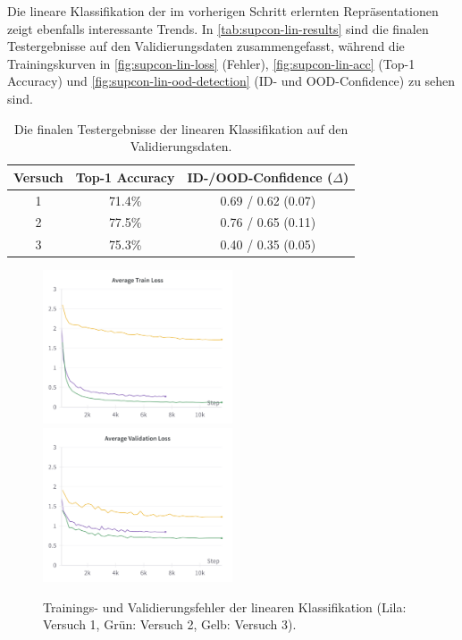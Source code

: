 Die lineare Klassifikation der im vorherigen Schritt erlernten Repräsentationen zeigt ebenfalls interessante Trends. In \autoref{tab:supcon-lin-results} sind die finalen Testergebnisse auf den Validierungsdaten zusammengefasst, während die Trainingskurven in \autoref{fig:supcon-lin-loss} (Fehler), \autoref{fig:supcon-lin-acc} (Top-1 Accuracy) und \autoref{fig:supcon-lin-ood-detection} (ID- und OOD-Confidence) zu sehen sind.

\begin{table}[h]
	\caption{Die finalen Testergebnisse der linearen Klassifikation auf den Validierungsdaten.}
	\begin{tabular}{|c|c|c|}
		\hline
		\textbf{Versuch} & \textbf{Top-1 Accuracy} & \textbf{ID-/OOD-Confidence ($\Delta$)} \\
		\hline
		1 & 71.4\% & 0.69 / 0.62 (0.07) \\
		2 & 77.5\% & 0.76 / 0.65 (0.11) \\
		3 & 75.3\% & 0.40 / 0.35 (0.05) \\
		\hline
	\end{tabular}
	\label{tab:supcon-lin-results}
\end{table}

\newpage

\begin{figure}[h]
	\centering
	\includegraphics[width=0.5\textwidth]{figure_results_supcon-lin_avg-train-loss.png}%
	\includegraphics[width=0.5\textwidth]{figure_results_supcon-lin_avg-val-loss.png}
	\caption[Trainings- und Validierungsfehler der linearen Klassifikation.]{Trainings- und Validierungsfehler der linearen Klassifikation (\textcolor{exp1}{Lila}: Versuch 1, \textcolor{exp2}{Grün}: Versuch 2, \textcolor{exp3}{Gelb}: Versuch 3).}
	\label{fig:supcon-lin-loss}
\end{figure}

